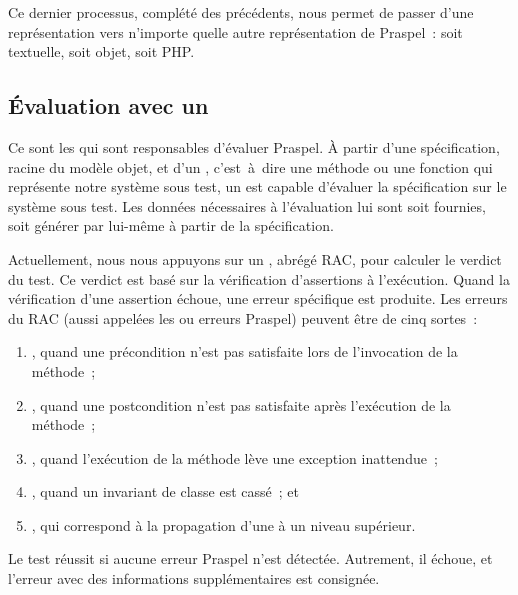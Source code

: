 Ce dernier processus, complété des précédents, nous permet de passer d'une
représentation vers n'importe quelle autre représentation de Praspel~: soit
textuelle, soit objet, soit PHP.

\subsection{Évaluation avec un }
\label{subsection:tools:evaluation}

Ce sont les  qui sont responsables d'évaluer
Praspel. À partir d'une spécification, racine du modèle objet, et d'un
, c'est~à~dire une méthode ou une fonction qui représente
notre système sous test, un  est capable d'évaluer
la spécification sur le système sous test. Les données nécessaires à
l'évaluation lui sont soit fournies, soit générer par lui-même à partir de la
spécification.

Actuellement, nous nous appuyons sur un ,
abrégé RAC, pour calculer le verdict du test. Ce verdict est basé sur la
vérification d'assertions à l'exécution. Quand la vérification d'une assertion
échoue, une erreur spécifique est produite. Les erreurs du RAC (aussi appelées
les  ou erreurs Praspel) peuvent être de cinq
sortes~:
%
\begin{enumerate}

\item {}, quand une précondition n'est pas
satisfaite lors de l'invocation de la méthode~;

\item {}, quand une postcondition n'est pas
satisfaite après l'exécution de la méthode~;

\item {}, quand l'exécution de la méthode lève une
exception inattendue~;

\item {}, quand un invariant de classe est cassé~; et

\item {}, qui correspond à la propagation
d'une  à un niveau supérieur.

\end{enumerate}
%
Le test réussit si aucune erreur Praspel n'est détectée. Autrement, il échoue,
et l'erreur avec des informations supplémentaires est consignée.

